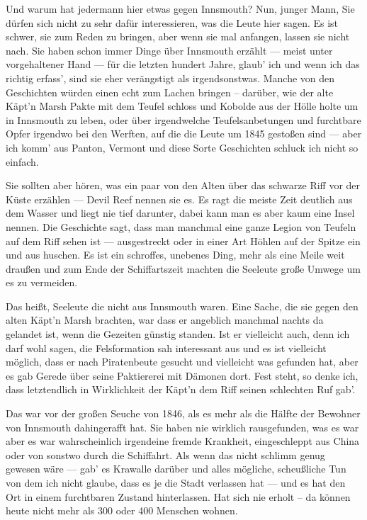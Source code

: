 Und warum hat jedermann hier etwas gegen Innsmouth? Nun, junger Mann, Sie dürfen sich nicht zu sehr dafür interessieren, was die Leute hier sagen. Es ist schwer, sie zum Reden zu bringen, aber wenn sie mal anfangen, lassen sie nicht nach. Sie haben schon immer Dinge über Innsmouth erzählt --- meist unter vorgehaltener Hand --- für die letzten hundert Jahre, glaub' ich und wenn ich das richtig erfass', sind sie eher verängstigt als irgendsonstwas. Manche von den Geschichten würden einen echt zum Lachen bringen -- darüber, wie der alte Käpt'n Marsh Pakte mit dem Teufel schloss und Kobolde aus der Hölle holte um in Innsmouth zu leben, oder über irgendwelche Teufelsanbetungen und furchtbare Opfer irgendwo bei den Werften, auf die die Leute um 1845 gestoßen sind --- aber ich komm' aus Panton, Vermont und diese Sorte Geschichten schluck ich nicht so einfach.

Sie sollten aber hören, was ein paar von den Alten über das schwarze Riff vor der Küste erzählen --- Devil Reef nennen sie es. Es ragt die meiste Zeit deutlich aus dem Wasser und liegt nie tief darunter, dabei kann man es aber kaum eine Insel nennen. Die Geschichte sagt, dass man manchmal eine ganze Legion von Teufeln auf dem Riff sehen ist --- ausgestreckt oder in einer Art Höhlen auf der Spitze ein und aus huschen. Es ist ein schroffes, unebenes Ding, mehr als eine Meile weit draußen und zum Ende der Schiffartszeit machten die Seeleute große Umwege um es zu vermeiden.

Das heißt, Seeleute die nicht aus Innsmouth waren. Eine Sache, die sie gegen den alten Käpt'n Marsh brachten, war dass er angeblich manchmal nachts da gelandet ist, wenn die Gezeiten günstig standen. Ist er vielleicht auch, denn ich darf wohl sagen, die Felsformation sah interessant aus und es ist vielleicht möglich, dass er nach Piratenbeute gesucht und vielleicht was gefunden hat, aber es gab Gerede über seine Paktiererei mit Dämonen dort. Fest steht, so denke ich, dass letztendlich in Wirklichkeit der Käpt'n dem Riff seinen schlechten Ruf gab'.

Das war vor der großen Seuche von 1846, als es mehr als die Hälfte der Bewohner von Innsmouth dahingerafft hat. Sie haben nie wirklich rausgefunden, was es war aber es war wahrscheinlich irgendeine fremde Krankheit, eingeschleppt aus China oder von sonstwo durch die Schiffahrt. Als wenn das nicht schlimm genug gewesen wäre --- gab' es Krawalle darüber und alles mögliche, scheußliche Tun von dem ich nicht glaube, dass es je die Stadt verlassen hat --- und es hat den Ort in einem furchtbaren Zustand hinterlassen. Hat sich nie erholt -- da können heute nicht mehr als 300 oder 400 Menschen wohnen.

